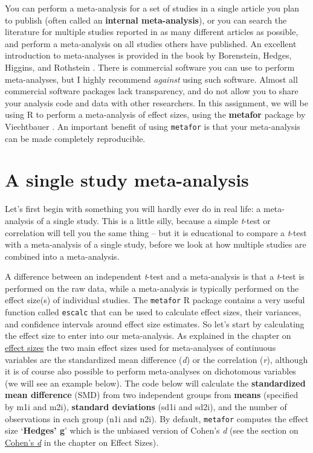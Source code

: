 \documentclass[
  oneside]{book}
\begin{document}
You can perform a meta-analysis for a set of studies in a single article you plan to publish (often called an \textbf{internal meta-analysis}), or you can search the literature for multiple studies reported in as many different articles as possible, and perform a meta-analysis on all studies others have published. An excellent introduction to meta-analyses is provided in the book by Borenstein, Hedges, Higgins, and Rothstein \citet{borenstein_introduction_2009}. There is commercial software you can use to perform meta-analyses, but I highly recommend \emph{against} using such software. Almost all commercial software packages lack transparency, and do not allow you to share your analysis code and data with other researchers. In this assignment, we will be using R to perform a meta-analysis of effect sizes, using the \textbf{metafor} package by Viechtbauer \citeyearpar{viechtbauer_conducting_2010}. An important benefit of using \texttt{metafor} is that your meta-analysis can be made completely reproducible.

\hypertarget{a-single-study-meta-analysis}{%
\section{A single study meta-analysis}\label{a-single-study-meta-analysis}}

Let's first begin with something you will hardly ever do in real life: a meta-analysis of a single study. This is a little silly, because a simple \emph{t}-test or correlation will tell you the same thing -- but it is educational to compare a \emph{t}-test with a meta-analysis of a single study, before we look at how multiple studies are combined into a meta-analysis.

A difference between an independent \emph{t}-test and a meta-analysis is that a \emph{t}-test is performed on the raw data, while a meta-analysis is typically performed on the effect size(s) of individual studies. The \texttt{metafor} R package contains a very useful function called \texttt{escalc} that can be used to calculate effect sizes, their variances, and confidence intervals around effect size estimates. So let's start by calculating the effect size to enter into our meta-analysis. As explained in the chapter on \protect\hyperlink{effectsize}{effect sizes} the two main effect sizes used for meta-analyses of continuous variables are the standardized mean difference (\emph{d}) or the correlation (\emph{r}), although it is of course also possible to perform meta-analyses on dichotomous variables (we will see an example below). The code below will calculate the \textbf{standardized mean difference} (SMD) from two independent groups from \textbf{means} (specified by m1i and m2i), \textbf{standard deviations} (sd1i and sd2i), and the number of observations in each group (n1i and n2i). By default, \texttt{metafor} computes the effect size `\textbf{Hedges' g}' which is the unbiased version of Cohen's \emph{d} (see the section on \protect\hyperlink{cohend}{Cohen's \emph{d}} in the chapter on Effect Sizes).
\end{document}
